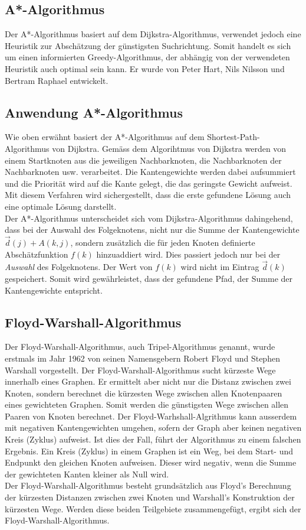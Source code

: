 \subsection{A*-Algorithmus}
Der A*-Algorithmus basiert auf dem Dijkstra-Algorithmus, verwendet jedoch eine Heuristik zur Abschätzung der günstigsten Suchrichtung. Somit handelt es sich um einen informierten Greedy-Algorithmus, der abhängig von der verwendeten Heuristik auch optimal sein kann. Er wurde von Peter Hart, Nils Nilsson und Bertram Raphael entwickelt.

\subsection{Anwendung A*-Algorithmus}
Wie oben erwähnt basiert der A*-Algorithmus auf dem Shortest-Path-Algorithmus von Dijkstra. Gemäss dem Algorihtmus von Dijkstra werden von einem Startknoten aus die jeweiligen Nachbarknoten, die Nachbarknoten der Nachbarknoten usw. verarbeitet. Die Kantengewichte werden dabei aufsummiert und die Priorität wird auf die Kante gelegt, die das geringste Gewicht aufweist. Mit diesem Verfahren wird sichergestellt, dass die erste gefundene Lösung auch eine optimale Lösung darstellt.\\

Der A*-Algorithmus unterscheidet sich vom Dijkstra-Algorithmus dahingehend, dass bei der Auswahl des Folgeknotens, nicht nur die Summe der Kantengewichte $\vec{d}(j)+A(k,j)$, sondern zusätzlich die für jeden Knoten definierte Abschätzfunktion $f(k)$ hinzuaddiert wird. Dies passiert jedoch nur bei der \emph{Auswahl} des Folgeknotens. Der Wert von $f(k)$ wird nicht im Eintrag $\vec{d}(k)$ gespeichert. Somit wird gewährleistet, dass der gefundene Pfad, der Summe der Kantengewichte entspricht.

\subsection{Floyd-Warshall-Algorithmus}
Der Floyd-Warshall-Algorithmus, auch Tripel-Algorithmus genannt, wurde erstmals im Jahr 1962 von seinen Namensgebern Robert Floyd und Stephen Warshall vorgestellt.
Der Floyd-Warshall-Algorithmus sucht kürzeste Wege innerhalb eines Graphen. Er ermittelt aber nicht nur die Distanz zwischen zwei Knoten, sondern berechnet die kürzesten Wege zwischen allen Knotenpaaren eines gewichteten Graphen. Somit werden die günstigsten Wege zwischen allen Paaren von Knoten berechnet. Der Floyd-Warhshall-Algrithmus kann ausserdem mit negativen Kantengewichten umgehen, sofern der Graph aber keinen negativen Kreis (Zyklus) aufweist. Ist dies der Fall, führt der Algorithmus zu einem falschen Ergebnis.
Ein Kreis (Zyklus) in einem Graphen ist ein Weg, bei dem Start- und Endpunkt den gleichen Knoten aufweisen. Dieser wird negativ, wenn die Summe der gewichteten Kanten kleiner als Null wird.\\
Der Floyd-Warshall-Algorithmus besteht grundsätzlich aus Floyd's Berechnung der kürzesten Distanzen zwischen zwei Knoten und Warshall's Konstruktion der kürzesten Wege. Werden diese beiden Teilgebiete zusammengefügt, ergibt sich der Floyd-Warshall-Algorithmus.

